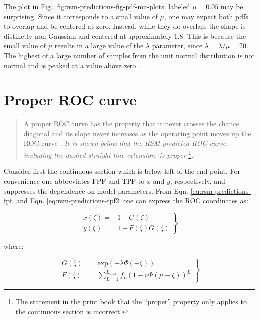 \documentclass[
]{book}
\begin{document}
The plot in Fig. \ref{fig:rsm-predictions-fig-pdf-mu-plots} labeled \(\mu = 0.05\) may be surprising. Since it corresponds to a small value of \(\mu\), one may expect both pdfs to overlap and be centered at zero. Instead, while they do overlap, the shape is distinctly non-Gaussian and centered at approximately 1.8. This is because the small value of \(\mu\) results in a large value of the \(\lambda\) parameter, since \(\lambda = \lambda / \mu = 20\). The highest of a large number of samples from the unit normal distribution is not normal and is peaked at a value above zero \citep{fisher1928limiting}.

\hypertarget{rsm-predictions-roc-curve-proper}{%
\section{Proper ROC curve}\label{rsm-predictions-roc-curve-proper}}

\begin{quote}
A proper ROC curve has the property that it never crosses the chance diagonal and its slope never increases as the operating point moves up the ROC curve \citep{metz1999proper, macmillan2004detection}. \emph{It is shown below that the RSM predicted ROC curve, including the dashed straight line extension, is proper} \footnote{The statement in the print book that the ``proper'' property only applies to the continuous section is incorrect.}.
\end{quote}

Consider first the continuous section which is below-left of the end-point. For convenience one abbreviates FPF and TPF to \(x\) and \(y\), respectively, and suppresses the dependence on model parameters. From Eqn. \eqref{eq:rsm-predictions-fpf} and Eqn. \eqref{eq:rsm-predictions-tpf2} one can express the ROC coordinates as:

\begin{equation}
\left. 
\begin{aligned}
x\left ( \zeta \right ) =& 1 - G\left ( \zeta \right )\\
y\left ( \zeta \right ) =& 1 - F\left ( \zeta \right ) G\left ( \zeta \right ) 
\end{aligned}
\right \}
\label{eq:rsm-predictions-f-g}
\end{equation}

where:

\begin{equation}
\left. 
\begin{aligned}
G\left ( \zeta \right ) =& \text{exp}\left ( -\lambda \Phi \left ( -\zeta \right )\right )\\
F\left ( \zeta \right ) =& \sum_{L=1}^{L_{max}} f_L  \left ( 1 - \nu \Phi \left ( \mu -\zeta \right ) \right )^L 
\end{aligned}
\right \}
\label{eq:rsm-predictions-fg-defs}
\end{equation}
\end{document}
